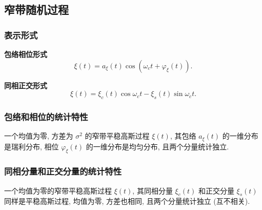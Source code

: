 \subsection{窄带随机过程}
\subsubsection{表示形式}
\textbf{包络相位形式}
\begin{equation}
    \xi(t)=a_\xi(t)\cos(\omega_ct+\varphi_\xi(t)).
\end{equation}

\textbf{同相正交形式}
\begin{equation}
    \xi(t)=\xi_c(t)\cos\omega_ct-\xi_s(t)\sin\omega_ct.
\end{equation}

\subsubsection{包络和相位的统计特性}
一个均值为零, 方差为 $\sigma^2$ 的窄带平稳高斯过程 $\xi(t)$, 其包络 $a_\xi(t)$ 的一维分布是瑞利分布, 相位 $\varphi_\xi(t)$ 的一维分布是均匀分布, 且两个分量统计独立.

\subsubsection{同相分量和正交分量的统计特性}
一个均值为零的窄带平稳高斯过程 $\xi(t)$, 其同相分量 $\xi_c(t)$ 和正交分量 $\xi_s(t)$ 同样是平稳高斯过程, 均值为零, 方差也相同, 且两个分量统计独立 (互不相关).
